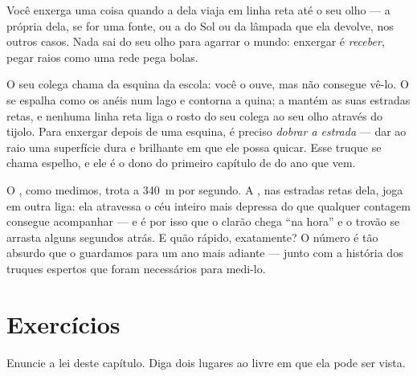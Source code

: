 \begin{proposition}\label{prop:g4:light-straight-lines:seeing}
Você enxerga uma coisa quando a  dela viaja em linha reta até o
seu olho --- a  própria dela, se for uma fonte, ou a  do Sol ou
da lâmpada que ela devolve, nos outros casos. Nada sai do seu olho
para agarrar o mundo: enxergar é \emph{receber}, pegar raios como uma
rede pega bolas.
\end{proposition}

\begin{example}\label{ex:g4:light-straight-lines:corner}
O seu colega chama da esquina da escola: você o ouve, mas não
consegue vê-lo. O  se espalha como os anéis num lago e contorna a
quina; a  mantém as suas estradas retas, e nenhuma linha reta liga
o rosto do seu colega ao seu olho através do tijolo. Para enxergar
depois de uma esquina, é preciso \emph{dobrar a estrada} --- dar ao
raio uma superfície dura e brilhante em que ele possa quicar. Esse
truque se chama espelho, e ele é o dono do primeiro capítulo de 
do ano que vem.
\end{example}

\begin{remark}\label{rem:g4:light-straight-lines:speed}
O , como medimos, trota a \qty{340}{m} por segundo. A , nas
estradas retas dela, joga em outra liga: ela atravessa o céu inteiro
mais depressa do que qualquer contagem consegue acompanhar --- e é
por isso que o clarão chega ``na hora'' e o trovão se arrasta alguns
segundos atrás. E quão rápido, exatamente? O número é tão absurdo que
o guardamos para um ano mais adiante --- junto com a história dos
truques espertos que foram necessários para medi-lo.
\end{remark}

\section{Exercícios}

\begin{exercise}[$\star$]\label{exo:g4:light-straight-lines:1}
Enuncie a lei deste capítulo. Diga dois lugares ao  livre em que
ela pode ser vista.
\end{exercise}

